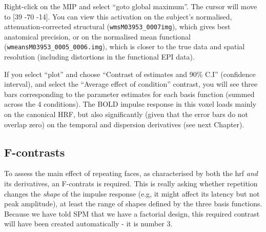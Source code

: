 Right-click on the MIP and select ``goto global maximum''. The cursor will move to [39 -70 -14]. You can view this activation on the subject's normalised, attenuation-corrected structural (\texttt{wmsM03953\_0007\.img}), which gives best anatomical precision, or on the normalised mean functional (\texttt{wmeansM03953\_0005\_0006.img}), which is closer to the true data and spatial resolution (including distortions in the functional EPI data). 

If you select ``plot'' and choose ``Contrast of estimates and 90\% C.I'' (confidence interval), and select the ``Average effect of condition'' contrast, you will see three bars corresponding to the parameter estimates for each basis function (summed across the 4 conditions). The BOLD impulse response in this voxel loads mainly on the canonical HRF, but also significantly (given that the error bars do not overlap zero) on the temporal and dispersion derivatives (see next Chapter).

\subsection{F-contrasts}

To assess the main effect of repeating faces, as characterised by both the hrf \emph{and} its derivatives, an F-contrats is required. This is really asking whether repetition changes the \emph{shape} of the impulse response (e.g, it might affect its latency but not peak amplitude), at least the range of shapes defined by the three basis functions. Because we have told SPM that we have a factorial design, this required contrast will have been created automatically - it is number 3. 

